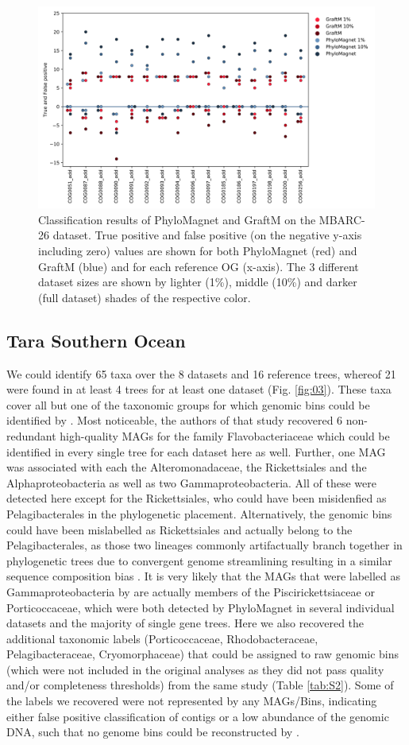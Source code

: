\documentclass{bioinfo}
\begin{document}
\begin{figure}[!tpb]%
\centerline{\includegraphics[width=.45\textwidth]{figures/Fig2.png}}
\caption{Classification results of PhyloMagnet and GraftM on the MBARC-26 dataset. True positive and false positive (on the negative y-axis including zero) values are shown for both PhyloMagnet (red) and GraftM (blue) and for each reference OG (x-axis). The 3 different dataset sizes are shown by lighter (1\%), middle (10\%) and darker (full dataset) shades of the respective color.} \label{fig:02}
\end{figure}

\subsection{Tara Southern Ocean}
We could identify 65 taxa over the 8 datasets and 16 reference trees, whereof 21 were found in at least 4 trees for at least one dataset (Fig. \ref{fig:03}). These taxa cover all but one of the taxonomic groups for which genomic bins could be identified by \citet[][marked with an asterisk in Fig. \ref{fig:03}]{Delmont2018}. Most noticeable, the authors of that study recovered 6 non-redundant high-quality MAGs for the family Flavobacteriaceae which could be identified in every single tree for each dataset here as well. Further, one MAG was associated with each the Alteromonadaceae, the Rickettsiales and the Alphaproteobacteria as well as two Gammaproteobacteria. All of these were detected here except for the Rickettsiales, who could have been misidenfied as Pelagibacterales in the phylogenetic placement. Alternatively, the genomic bins could have been mislabelled as Rickettsiales and actually belong to the Pelagibacterales, as those two lineages commonly artifactually branch together in phylogenetic trees due to convergent genome streamlining resulting in a similar sequence composition bias \citep{Roger2017,Martijn2018,Rodriguez-Ezpeleta2012,Viklund2013}. It is very likely that the MAGs that were labelled as Gammaproteobacteria by \citet{Delmont2018} are actually members of the Piscirickettsiaceae or Porticoccaceae, which were both detected by PhyloMagnet in several individual datasets and the majority of single gene trees. Here we also recovered the additional taxonomic labels (Porticoccaceae, Rhodobacteraceae, Pelagibacteraceae, Cryomorphaceae) that could be assigned to raw genomic bins (which were not included in the original analyses as they did not pass quality and/or completeness thresholds) from the same study (Table \ref{tab:S2}). Some of the labels we recovered were not represented by any MAGs/Bins, indicating either false positive classification of contigs or a low abundance of the genomic DNA, such that no genome bins could be reconstructed by \citet{Delmont2018}.
\end{document}
